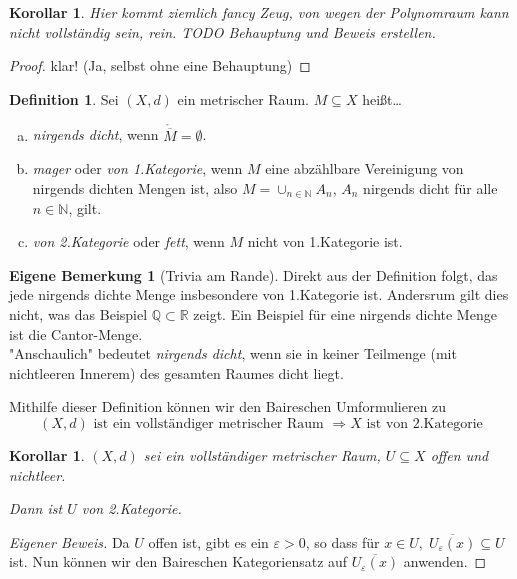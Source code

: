 \documentclass[ngerman]{report}
\theoremstyle{plain}%
\newtheorem{cor}[thm]{Korollar}
\newtheorem*{cor*}{Korollar}
\theoremstyle{definition}%
\newtheorem{definition}[thm]{Definition}
\theoremstyle{myStyle}
\newtheorem*{mbem*}{Eigene Bemerkung}
\newcommand{\R}{\mathbb{R}}
\newcommand{\Q}{\mathbb{Q}}
\newcommand{\N}{\mathbb{N}}
\newcommand{\df}[1][]{%
	\overset{#1}{\Rightarrow}
}
\newcommand{\qmarks}[1]{"{}#1"{}}
\begin{document}
\begin{cor*}
Hier kommt ziemlich fancy Zeug, von wegen der Polynomraum kann nicht vollständig sein, rein. TODO Behauptung und Beweis erstellen.
\end{cor*}
\begin{proof}
klar! (Ja, selbst ohne eine Behauptung)
\end{proof}

\begin{definition}
	Sei $(X,d)$ ein metrischer Raum. $M\subseteq X$ heißt\dots
	\begin{enumerate}[(a)]
		\item \textit{nirgends dicht}, wenn $\mathring{\overline{M}} = \emptyset$.
		
		\item \textit{mager} oder \textit{von 1.Kategorie}, wenn $M$ eine abzählbare Vereinigung von nirgends dichten Mengen ist, also $M = \cup_{n\in\N} A_n$, $A_n$ nirgends dicht für alle $n\in\N$, gilt.
		
		\item \textit{von 2.Kategorie }oder\textit{ fett}, wenn $M$ nicht von 1.Kategorie ist.
	\end{enumerate}
\end{definition}\par\bigskip

\begin{mbem*}[Trivia am Rande] Direkt aus der Definition folgt, das jede nirgends dichte Menge insbesondere von 1.Kategorie ist. Andersrum gilt dies nicht, was das Beispiel $\Q\subset \R$ zeigt. Ein Beispiel für eine nirgends dichte Menge ist die Cantor-Menge.\\
	 \qmarks{Anschaulich} bedeutet \textit{nirgends dicht}, wenn sie in keiner Teilmenge (mit nichtleeren Innerem) des gesamten Raumes dicht liegt. \par\bigskip
\end{mbem*}
	Mithilfe dieser Definition können wir den Baireschen Umformulieren zu $$(X,d) \text{ ist ein vollständiger metrischer Raum } \df X \text{ ist von 2.Kategorie}$$ 

\begin{cor}
	$(X,d)$ sei ein vollständiger metrischer Raum, $U\subseteq X$ offen und nichtleer.\par
	Dann ist $U$ von 2.Kategorie.
\end{cor} 
\begin{proof}[Eigener Beweis]
	Da $U$ offen ist, gibt es ein $\varepsilon>0$, so dass für $x\in U,\;\overline{U_\varepsilon(x)}\subseteq U$ ist. Nun können wir den Baireschen Kategoriensatz auf $\overline{U_\varepsilon(x)}$ anwenden.
\end{proof}
\end{document}
